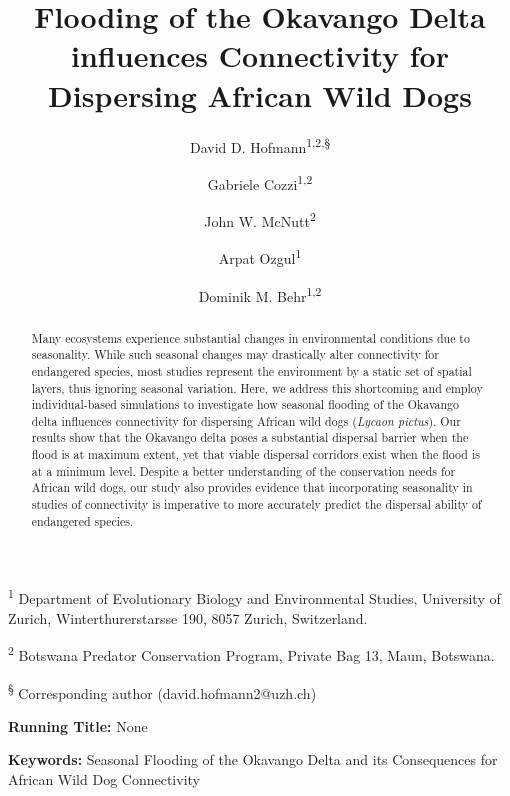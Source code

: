 \documentclass[abstract=on,10pt,a4paper,bibliography=totocnumbered]{article}
\title{Flooding of the Okavango Delta influences Connectivity for Dispersing
African Wild Dogs}
\author{
  David D. Hofmann\textsuperscript{1,2,\S} \orcid{0000-0003-3477-4365} \and
  Gabriele Cozzi\textsuperscript{1,2} \orcid{0000-0002-1744-1940} \and
  John W. McNutt\textsuperscript{2} \and
  Arpat Ozgul\textsuperscript{1} \orcid{0000-0001-7477-2642} \and
  Dominik M. Behr\textsuperscript{1,2} \orcid{0000-0001-7378-8538}
}
\begin{document}



\maketitle

\begin{flushleft}

\vspace{0.5cm}

\textsuperscript{1} Department of Evolutionary Biology and Environmental
Studies, University of Zurich, Winterthurerstarsse 190, 8057 Zurich,
Switzerland.

\textsuperscript{2} Botswana Predator Conservation Program, Private Bag 13,
Maun, Botswana.

\textsuperscript{\S} Corresponding author (david.hofmann2@uzh.ch)

\vspace{4cm}

\textbf{Running Title:} None

\vspace{0.5cm}

\textbf{Keywords:} Seasonal Flooding of the Okavango Delta and its Consequences
for African Wild Dog Connectivity

\end{flushleft}

\newpage
\begin{abstract}
Many ecosystems experience substantial changes in environmental conditions due
to seasonality. While such seasonal changes may drastically alter connectivity
for endangered species, most studies represent the environment by a static set
of spatial layers, thus ignoring seasonal variation. Here, we address this
shortcoming and employ individual-based simulations to investigate how seasonal
flooding of the Okavango delta influences connectivity for dispersing African
wild dogs (\textit{Lycaon pictus}). Our results show that the Okavango delta
poses a substantial dispersal barrier when the flood is at maximum extent, yet
that viable dispersal corridors exist when the flood is at a minimum level.
Despite a better understanding of the conservation needs for African wild dogs,
our study also provides evidence that incorporating seasonality in studies of
connectivity is imperative to more accurately predict the dispersal ability of
endangered species.
\end{abstract}
\end{document}
